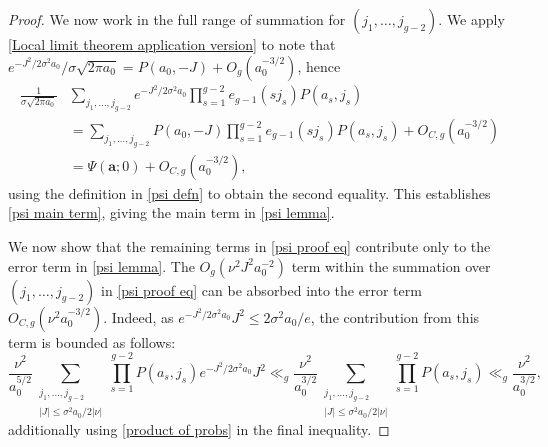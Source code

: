 \documentclass[hidelinks,11pt,reqno]{amsart}
\renewcommand{\leq}{\leqslant}
\newcommand{\ru}[1]{e_{g-1}(#1)}
\theoremstyle{remark}
\begin{document}
\begin{proof}
    We now work in the full range of summation for $(j_{1},\ldots, j_{g-2})$. We apply \cref{Local limit theorem application version} to note that $e^{-J^{2}/2\sigma^{2}a_{0}}/\sigma\sqrt{2\pi a_{0}}=P(a_{0},-J)+O_{g}(a_{0}^{-3/2})$, hence
    \begin{align*}
         \frac{1}{\sigma\sqrt{2\pi a_{0}}}&\sum_{j_{1},\ldots, j_{g-2}}e^{-J^{2}/2\sigma^{2}a_{0}}\prod_{s=1}^{g-2}\ru{sj_{s}}P(a_{s},j_{s})\\&=\sum_{j_{1},\ldots, j_{g-2}}P(a_{0},-J)\prod_{s=1}^{g-2}\ru{sj_{s}}P(a_{s},j_{s})+O_{C,g}(a_{0}^{-3/2})\\
         &=\Psi(\mathbf{a};0)+O_{C,g}(a_{0}^{-3/2}),
    \end{align*}
    using the definition in \cref{psi defn} to obtain the second equality. This establishes \cref{psi main term}, giving the main term in \cref{psi lemma}.

   We now show that the remaining terms in \cref{psi proof eq} contribute only to the error term in \cref{psi lemma}. The $O_{g}(\nu^{2}J^{2}a_{0}^{-2})$ term within the summation over $(j_{1},\ldots, j_{g-2})$ in \cref{psi proof eq} can be absorbed into the error term $O_{C,g}(\nu^{2}a_{0}^{-3/2})$. Indeed, as $e^{-J^{2}/2\sigma^{2}a_{0}}J^{2}\leq 2\sigma^{2}a_{0}/e$, the contribution from this term is bounded as follows:
    \[\frac{\nu^{2}}{a_{0}^{5/2}}\sum_{\substack{j_{1},\ldots, j_{g-2}\\|J|\leq \sigma^{2}a_{0}/2|\nu|}}\prod_{s=1}^{g-2}P(a_{s},j_{s})e^{-J^{2}/2\sigma^{2}a_{0}}J^{2}\ll_{g} \frac{\nu^{2}}{a_{0}^{3/2}}\sum_{\substack{j_{1},\ldots, j_{g-2}\\|J|\leq \sigma^{2}a_{0}/2|\nu|}}\prod_{s=1}^{g-2}P(a_{s},j_{s})\ll_{g} \frac{\nu^{2}}{a_{0}^{3/2}},\]
    additionally using \cref{product of probs} in the final inequality. 


\end{proof}
\end{document}
